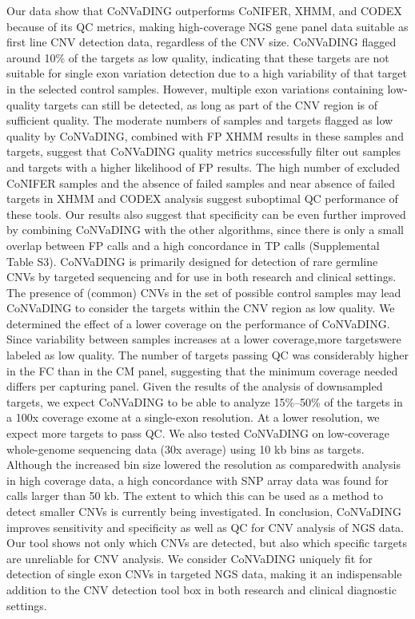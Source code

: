 Our data show that CoNVaDING outperforms CoNIFER, XHMM, and CODEX because of its QC metrics, making high-coverage NGS gene panel data suitable as first line CNV detection data, regardless of the CNV size. 
CoNVaDING flagged around 10\% of the targets as low quality, indicating that these targets are not suitable for single exon variation detection due to a high variability of that target in the selected control samples. 
However, multiple exon variations containing low-quality targets can still be detected, as long as part of the CNV region is of sufficient quality. 
The moderate numbers of samples and targets flagged as low quality by CoNVaDING, combined with FP XHMM results in these samples and targets, suggest that CoNVaDING quality metrics successfully filter out samples and targets with a higher likelihood of FP results. 
The high number of excluded CoNIFER samples and the absence of failed samples and near absence of failed targets in XHMM and CODEX analysis suggest suboptimal QC performance of these tools. 
Our results also suggest that specificity can be even further improved by combining CoNVaDING with the other algorithms, since there is only a small overlap between FP calls and a high concordance in TP calls (Supplemental Table S3). 
CoNVaDING is primarily designed for detection of rare germline CNVs by targeted sequencing and for use in both research and clinical settings. 
The presence of (common) CNVs in the set of possible control samples may lead CoNVaDING to consider the targets within the CNV region as low quality. 
We determined the effect of a lower coverage on the performance of CoNVaDING. 
Since variability between samples increases at a lower coverage,more targetswere labeled as low quality. 
The number of targets passing QC was considerably higher in the FC than in the CM panel, suggesting that the minimum coverage needed differs per capturing panel. 
Given the results of the analysis of downsampled targets, we expect CoNVaDING to be able to analyze 15\%–50\% of the targets in a 100x coverage exome at a single-exon resolution. 
At a lower resolution, we expect more targets to pass QC. 
We also tested CoNVaDING on low-coverage whole-genome sequencing data (30x average) using 10 kb bins as targets. 
Although the increased bin size lowered the resolution as comparedwith analysis in high coverage data, a high concordance with SNP array data was found for calls larger than 50 kb. 
The extent to which this can be used as a method to detect smaller CNVs is currently being investigated. 
In conclusion, CoNVaDING improves sensitivity and specificity as well as QC for CNV analysis of NGS data. 
Our tool shows not only which CNVs are detected, but also which specific targets are unreliable for CNV analysis. 
We consider CoNVaDING uniquely fit for detection of single exon CNVs in targeted NGS data, making it an indispensable addition to the CNV detection tool box in both research and clinical diagnostic settings.


